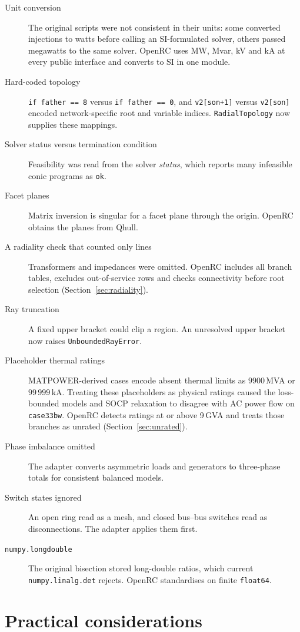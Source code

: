 \documentclass[11pt,a4paper]{report}
\newcommand{\code}[1]{\texttt{\small #1}}
\begin{document}
\begin{description}
\item[Unit conversion] The original scripts were not consistent in their
  units: some converted injections to watts before calling an SI-formulated
  solver, others passed megawatts to the same solver. OpenRC uses MW, Mvar, kV
  and kA at every public interface and converts to SI in one module.
\item[Hard-coded topology] \code{if father == 8} versus \code{if father == 0},
  and \code{v2[son+1]} versus \code{v2[son]} encoded network-specific root and
  variable indices. \code{RadialTopology} now supplies these mappings.
\item[Solver status versus termination condition] Feasibility was read from the
  solver \emph{status}, which reports many infeasible conic programs as
  \code{ok}.
\item[Facet planes] Matrix inversion is singular for a facet plane through the
  origin. OpenRC obtains the planes from Qhull.
\item[A radiality check that counted only lines] Transformers and impedances
  were omitted. OpenRC includes all branch tables, excludes out-of-service rows
  and checks connectivity before root selection (Section~\ref{sec:radiality}).
\item[Ray truncation] A fixed upper bracket could clip a region. An unresolved
  upper bracket now raises \code{UnboundedRayError}.
\item[Placeholder thermal ratings] MATPOWER-derived cases encode absent thermal
  limits as $9900$\,MVA or $99\,999$\,kA. Treating these placeholders as
  physical ratings caused the loss-bounded models and SOCP relaxation to
  disagree with AC power flow on \code{case33bw}. OpenRC detects ratings at or
  above 9\,GVA and treats those branches as unrated
  (Section~\ref{sec:unrated}).
\item[Phase imbalance omitted] The adapter converts asymmetric loads and
  generators to three-phase totals for consistent balanced models.
\item[Switch states ignored] An open ring read as a mesh, and closed bus--bus
  switches read as disconnections. The adapter applies them first.
\item[\code{numpy.longdouble}] The original bisection stored long-double ratios,
  which current \code{numpy.linalg.det} rejects. OpenRC standardises on finite
  \code{float64}.
\end{description}

\section{Practical considerations}
\end{document}
